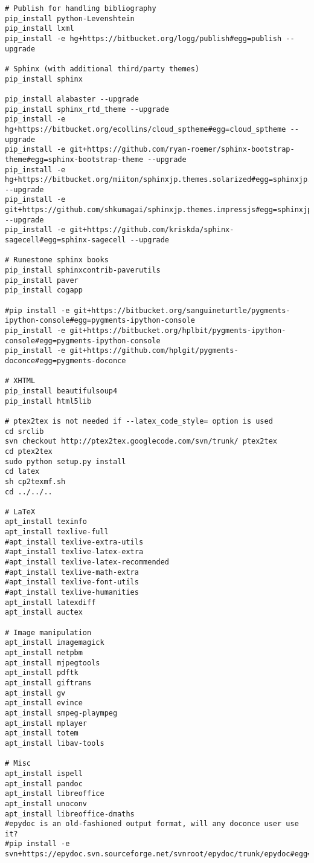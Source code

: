 \documentclass[%
oneside,                 %
final,                   %
chapterprefix=true,      %
open=right,              %
10pt]{book}
\begin{document}
\begin{verbatim}
# Publish for handling bibliography
pip_install python-Levenshtein
pip_install lxml
pip_install -e hg+https://bitbucket.org/logg/publish#egg=publish --upgrade

# Sphinx (with additional third/party themes)
pip_install sphinx

pip_install alabaster --upgrade
pip_install sphinx_rtd_theme --upgrade
pip_install -e hg+https://bitbucket.org/ecollins/cloud_sptheme#egg=cloud_sptheme --upgrade
pip_install -e git+https://github.com/ryan-roemer/sphinx-bootstrap-theme#egg=sphinx-bootstrap-theme --upgrade
pip_install -e hg+https://bitbucket.org/miiton/sphinxjp.themes.solarized#egg=sphinxjp.themes.solarized --upgrade
pip_install -e git+https://github.com/shkumagai/sphinxjp.themes.impressjs#egg=sphinxjp.themes.impressjs --upgrade
pip_install -e git+https://github.com/kriskda/sphinx-sagecell#egg=sphinx-sagecell --upgrade

# Runestone sphinx books
pip_install sphinxcontrib-paverutils
pip_install paver
pip_install cogapp

#pip install -e git+https://bitbucket.org/sanguineturtle/pygments-ipython-console#egg=pygments-ipython-console
pip_install -e git+https://bitbucket.org/hplbit/pygments-ipython-console#egg=pygments-ipython-console
pip_install -e git+https://github.com/hplgit/pygments-doconce#egg=pygments-doconce

# XHTML
pip_install beautifulsoup4
pip_install html5lib

# ptex2tex is not needed if --latex_code_style= option is used
cd srclib
svn checkout http://ptex2tex.googlecode.com/svn/trunk/ ptex2tex
cd ptex2tex
sudo python setup.py install
cd latex
sh cp2texmf.sh
cd ../../..

# LaTeX
apt_install texinfo
apt_install texlive-full
#apt_install texlive-extra-utils
#apt_install texlive-latex-extra
#apt_install texlive-latex-recommended
#apt_install texlive-math-extra
#apt_install texlive-font-utils
#apt_install texlive-humanities
apt_install latexdiff
apt_install auctex

# Image manipulation
apt_install imagemagick
apt_install netpbm
apt_install mjpegtools
apt_install pdftk
apt_install giftrans
apt_install gv
apt_install evince
apt_install smpeg-plaympeg
apt_install mplayer
apt_install totem
apt_install libav-tools

# Misc
apt_install ispell
apt_install pandoc
apt_install libreoffice
apt_install unoconv
apt_install libreoffice-dmaths
#epydoc is an old-fashioned output format, will any doconce user use it?
#pip install -e svn+https://epydoc.svn.sourceforge.net/svnroot/epydoc/trunk/epydoc#egg=epydoc


\end{verbatim}
\end{document}
